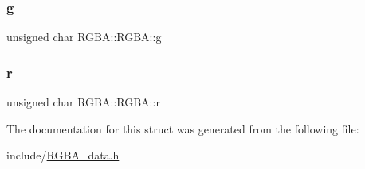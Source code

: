 \mbox{\label{struct_r_g_b_a_1_1_r_g_b_a_a00a209d9b4551824af7ab9fbd42d58c9}} 
\subsubsection{\texorpdfstring{g}{g}}
{\footnotesize\ttfamily unsigned char R\+G\+B\+A\+::\+R\+G\+B\+A\+::g}

\mbox{\label{struct_r_g_b_a_1_1_r_g_b_a_a87b888c8a942657465245278e56fbdcb}} 
\subsubsection{\texorpdfstring{r}{r}}
{\footnotesize\ttfamily unsigned char R\+G\+B\+A\+::\+R\+G\+B\+A\+::r}



The documentation for this struct was generated from the following file\+:\begin{DoxyCompactItemize}
\item 
include/\mbox{\hyperlink{_r_g_b_a__data_8h}{R\+G\+B\+A\+\_\+data.\+h}}\end{DoxyCompactItemize}
